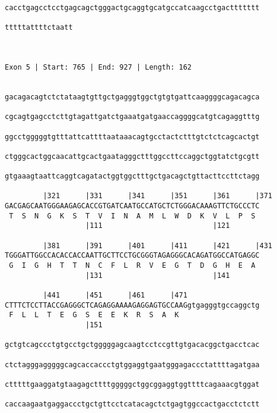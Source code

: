 \documentclass{article}
\begin{document}
\begin{Verbatim}
cacctgagcctcctgagcagctgggactgcaggtgcatgccatcaagcctgacttttttt
                                                            
tttttattttctaatt
                
                
 
Exon 5 | Start: 765 | End: 927 | Length: 162


gacagacagtctctataagtgttgctgagggtggctgtgtgattcaaggggcagacagca
                                                            
cgcagtgagcctcttgtagattgatctgaaatgatgaaccaggggcatgtcagaggtttg
                                                            
ggcctgggggtgtttattcattttaataaacagtgcctactctttgtctctcagcactgt
                                                            
ctgggcactggcaacattgcactgaatagggctttggccttccaggctggtatctgcgtt
                                                            
gtgaaagtaattcaggtcagatactggtggctttgctgacagctgttacttccttctagg
                                                            
         |321      |331      |341      |351      |361      |371
GACGAGCAATGGGAAGAGCACCGTGATCAATGCCATGCTCTGGGACAAAGTTCTGCCCTC
 T  S  N  G  K  S  T  V  I  N  A  M  L  W  D  K  V  L  P  S 
                   |111                          |121       
  
         |381      |391      |401      |411      |421      |431
TGGGATTGGCCACACCACCAATTGCTTCCTGCGGGTAGAGGGCACAGATGGCCATGAGGC
 G  I  G  H  T  T  N  C  F  L  R  V  E  G  T  D  G  H  E  A 
                   |131                          |141       
  
         |441      |451      |461      |471                 
CTTTCTCCTTACCGAGGGCTCAGAGGAAAAGAGGAGTGCCAAGgtgagggtgccaggctg
 F  L  L  T  E  G  S  E  E  K  R  S  A  K                   
                   |151                                     
  
gctgtcagccctgtgcctgctgggggagcaagtcctccgttgtgacacggctgacctcac
                                                            
ctctagggagggggcagcaccaccctgtggaggtgaatgggagaccctattttagatgaa
                                                            
ctttttgaaggatgtaagagcttttgggggctggcggaggtggttttcagaaacgtggat
                                                            
caccaagaatgaggaccctgctgttcctcatacagctctgagtggccactgacctctctt
                                                            

\end{Verbatim}
\end{document}
